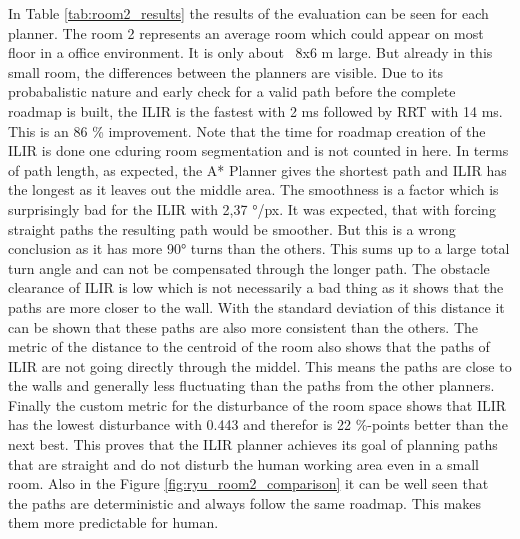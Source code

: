 In Table \ref{tab:room2_results} the results of the evaluation can be seen for each planner. The room 2 represents an average room which could appear on most floor in a office environment. It is only about ~8x6 m large. But already in this small room, the differences between the planners are visible. Due to its probabalistic nature and early check for a valid path before the complete roadmap is built, the ILIR is the fastest with 2 ms followed by RRT with 14 ms. This is an 86 \% improvement. Note that the time for roadmap creation of the ILIR is done one cduring room segmentation and is not counted in here. In terms of path length, as expected, the A* Planner gives the shortest path and ILIR has the longest as it leaves out the middle area. The smoothness is a factor which is surprisingly bad for the ILIR with 2,37 °/px. It was expected, that with forcing straight paths the resulting path would be smoother. But this is a wrong conclusion as it has more 90° turns than the others. This sums up to a large total turn angle and can not be compensated through the longer path. The obstacle clearance of ILIR is low which is not necessarily a bad thing as it shows that the paths are more closer to the wall. With the standard deviation of this distance it can be shown that these paths are also more consistent than the others. The metric of the distance to the centroid of the room also shows that the paths of ILIR are not going directly through the middel. This means the paths are close to the walls and generally less fluctuating than the paths from the other planners. Finally the custom metric for the disturbance of the room space shows that ILIR has the lowest disturbance with 0.443 and therefor is 22 \%-points better than the next best. This proves that the ILIR planner achieves its goal of planning paths that are straight and do not disturb the human working area even in a small room. Also in the Figure \ref{fig:ryu_room2_comparison} it can be well seen that the paths are deterministic and always follow the same roadmap. This makes them more predictable for human.

